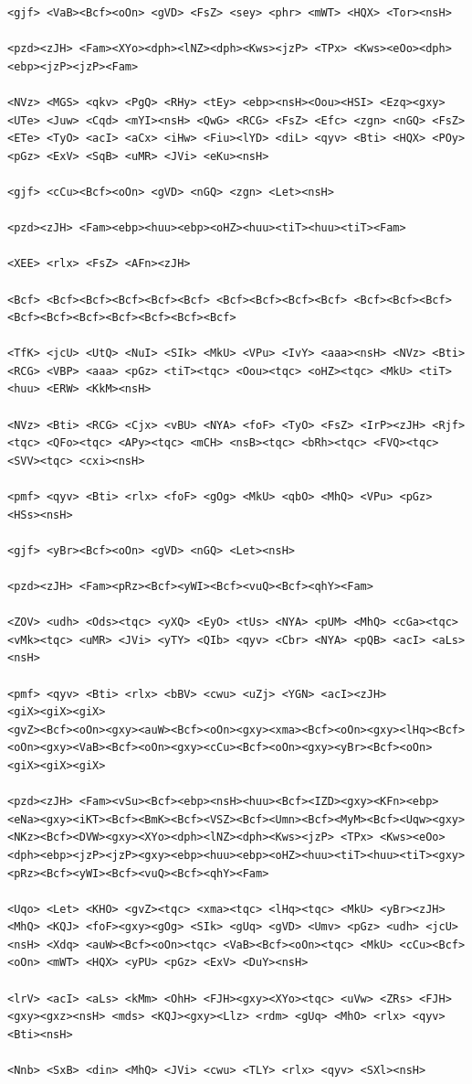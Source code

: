 \documentclass[10pt,letterpaper,twocolumn]{article}
\begin{document}
\begin{promptbox}
\begin{Verbatim}
<gjf> <VaB><Bcf><oOn> <gVD> <FsZ> <sey> <phr> <mWT> <HQX> <Tor><nsH>

<pzd><zJH> <Fam><XYo><dph><lNZ><dph><Kws><jzP> <TPx> <Kws><eOo><dph><ebp><jzP><jzP><Fam>

<NVz> <MGS> <qkv> <PgQ> <RHy> <tEy> <ebp><nsH><Oou><HSI> <Ezq><gxy><UTe> <Juw> <Cqd> <mYI><nsH> <QwG> <RCG> <FsZ> <Efc> <zgn> <nGQ> <FsZ> <ETe> <TyO> <acI> <aCx> <iHw> <Fiu><lYD> <diL> <qyv> <Bti> <HQX> <POy> <pGz> <ExV> <SqB> <uMR> <JVi> <eKu><nsH>

<gjf> <cCu><Bcf><oOn> <gVD> <nGQ> <zgn> <Let><nsH>

<pzd><zJH> <Fam><ebp><huu><ebp><oHZ><huu><tiT><huu><tiT><Fam>

<XEE> <rlx> <FsZ> <AFn><zJH>

<Bcf> <Bcf><Bcf><Bcf><Bcf><Bcf> <Bcf><Bcf><Bcf><Bcf> <Bcf><Bcf><Bcf><Bcf><Bcf><Bcf><Bcf><Bcf><Bcf><Bcf>

<TfK> <jcU> <UtQ> <NuI> <SIk> <MkU> <VPu> <IvY> <aaa><nsH> <NVz> <Bti> <RCG> <VBP> <aaa> <pGz> <tiT><tqc> <Oou><tqc> <oHZ><tqc> <MkU> <tiT><huu> <ERW> <KkM><nsH>

<NVz> <Bti> <RCG> <Cjx> <vBU> <NYA> <foF> <TyO> <FsZ> <IrP><zJH> <Rjf><tqc> <QFo><tqc> <APy><tqc> <mCH> <nsB><tqc> <bRh><tqc> <FVQ><tqc> <SVV><tqc> <cxi><nsH>

<pmf> <qyv> <Bti> <rlx> <foF> <gOg> <MkU> <qbO> <MhQ> <VPu> <pGz> <HSs><nsH>

<gjf> <yBr><Bcf><oOn> <gVD> <nGQ> <Let><nsH>

<pzd><zJH> <Fam><pRz><Bcf><yWI><Bcf><vuQ><Bcf><qhY><Fam>

<ZOV> <udh> <Ods><tqc> <yXQ> <EyO> <tUs> <NYA> <pUM> <MhQ> <cGa><tqc> <vMk><tqc> <uMR> <JVi> <yTY> <QIb> <qyv> <Cbr> <NYA> <pQB> <acI> <aLs><nsH>

<pmf> <qyv> <Bti> <rlx> <bBV> <cwu> <uZj> <YGN> <acI><zJH>
<giX><giX><giX>
<gvZ><Bcf><oOn><gxy><auW><Bcf><oOn><gxy><xma><Bcf><oOn><gxy><lHq><Bcf><oOn><gxy><VaB><Bcf><oOn><gxy><cCu><Bcf><oOn><gxy><yBr><Bcf><oOn>
<giX><giX><giX>

<pzd><zJH> <Fam><vSu><Bcf><ebp><nsH><huu><Bcf><IZD><gxy><KFn><ebp><eNa><gxy><iKT><Bcf><BmK><Bcf><VSZ><Bcf><Umn><Bcf><MyM><Bcf><Uqw><gxy><NKz><Bcf><DVW><gxy><XYo><dph><lNZ><dph><Kws><jzP> <TPx> <Kws><eOo><dph><ebp><jzP><jzP><gxy><ebp><huu><ebp><oHZ><huu><tiT><huu><tiT><gxy><pRz><Bcf><yWI><Bcf><vuQ><Bcf><qhY><Fam>

<Uqo> <Let> <KHO> <gvZ><tqc> <xma><tqc> <lHq><tqc> <MkU> <yBr><zJH> <MhQ> <KQJ> <foF><gxy><gOg> <SIk> <gUq> <gVD> <Umv> <pGz> <udh> <jcU><nsH> <Xdq> <auW><Bcf><oOn><tqc> <VaB><Bcf><oOn><tqc> <MkU> <cCu><Bcf><oOn> <mWT> <HQX> <yPU> <pGz> <ExV> <DuY><nsH>

<lrV> <acI> <aLs> <kMm> <OhH> <FJH><gxy><XYo><tqc> <uVw> <ZRs> <FJH><gxy><gxz><nsH> <mds> <KQJ><gxy><Llz> <rdm> <gUq> <MhO> <rlx> <qyv> <Bti><nsH>

<Nnb> <SxB> <din> <MhQ> <JVi> <cwu> <TLY> <rlx> <qyv> <SXl><nsH>
\end{Verbatim}
\end{promptbox}
\end{document}
